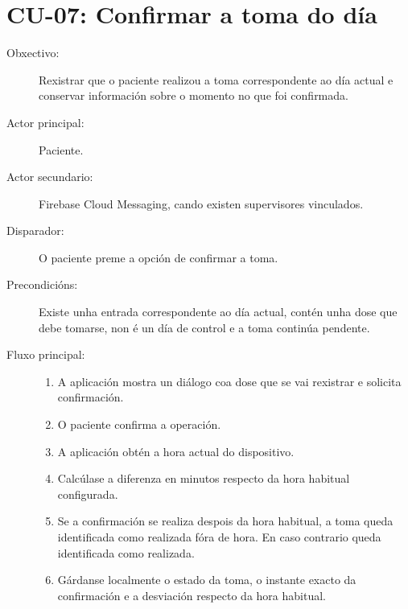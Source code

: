 
\section{CU-07: Confirmar a toma do día}
\label{cu:confirmar-toma}

\begin{description}

\item[Obxectivo:] Rexistrar que o paciente realizou a toma correspondente ao día
actual e conservar información sobre o momento no que foi confirmada.

\item[Actor principal:] Paciente.

\item[Actor secundario:] Firebase Cloud Messaging, cando existen supervisores
vinculados.

\item[Disparador:] O paciente preme a opción de confirmar a toma.

\item[Precondicións:] Existe unha entrada correspondente ao día actual, contén
unha dose que debe tomarse, non é un día de control e a toma continúa pendente.

\item[Fluxo principal:] \hfill
\begin{enumerate}
    \item A aplicación mostra un diálogo coa dose que se vai rexistrar e solicita
    confirmación.

    \item O paciente confirma a operación.

    \item A aplicación obtén a hora actual do dispositivo.

    \item Calcúlase a diferenza en minutos respecto da hora habitual configurada.

    \item Se a confirmación se realiza despois da hora habitual, a toma queda
    identificada como realizada fóra de hora. En caso contrario queda
    identificada como realizada.

    \item Gárdanse localmente o estado da toma, o instante exacto da confirmación
    e a desviación respecto da hora habitual.


\end{enumerate}
\end{description}

